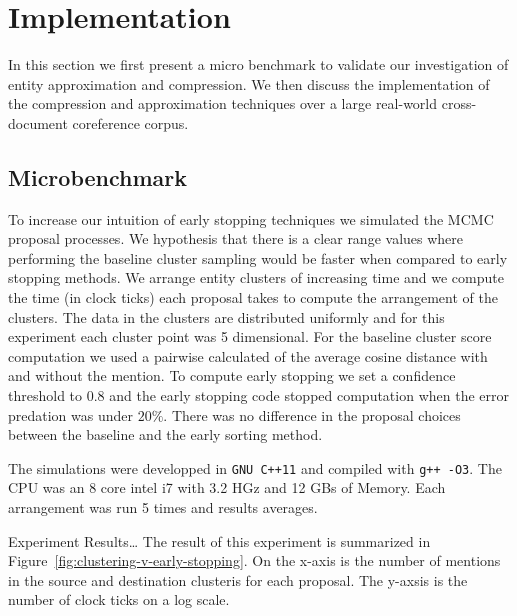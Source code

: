 
\section{Implementation}

In this section we first present a micro benchmark to validate our investigation of entity approximation and compression.
We then discuss the implementation of the compression and approximation techniques over a large real-world
cross-document coreference corpus.

\subsection{Microbenchmark}
\label{sec:microbenchmark}
To increase our intuition of early stopping techniques we simulated the MCMC proposal processes. 
We hypothesis that there is a clear range values where performing the
baseline cluster sampling would be faster when compared to early stopping methods.
We arrange entity clusters of increasing time and we compute the time (in clock ticks)
each proposal takes to compute the arrangement of the clusters.
The data in the clusters are distributed uniformly and for this experiment each cluster point
was 5 dimensional.
For the baseline cluster score computation we used a pairwise calculated of the average cosine distance
with and without the mention.
To compute early stopping we set a confidence threshold to $0.8$ and the early
stopping code stopped computation when the error predation was under $20\%$.
There was no difference in the proposal choices between the baseline and the early sorting method. 

The simulations were developped in \texttt{GNU C++11} and compiled with \texttt{g++ -O3}. 
The CPU was an 8 core intel i7 with 3.2 HGz and 12 GBs of Memory.
Each arrangement was run 5 times and results averages.


Experiment Results\ldots
The result of this experiment is summarized in Figure~\ref{fig:clustering-v-early-stopping}.
On the x-axis is the number of mentions in the source and destination clusteris for each proposal. 
The y-axsis is the number of clock ticks on a log scale.

